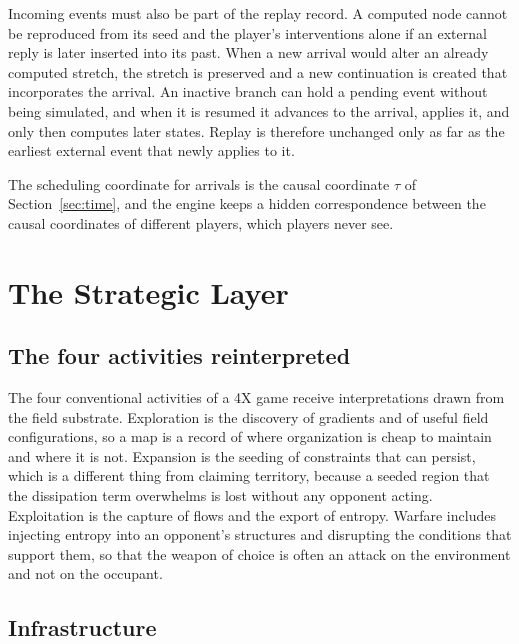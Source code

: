\documentclass[11pt]{article}
\begin{document}
Incoming events must also be part of the replay record. A computed node cannot be reproduced from its seed and the player's interventions alone if an external reply is later inserted into its past. When a new arrival would alter an already computed stretch, the stretch is preserved and a new continuation is created that incorporates the arrival. An inactive branch can hold a pending event without being simulated, and when it is resumed it advances to the arrival, applies it, and only then computes later states. Replay is therefore unchanged only as far as the earliest external event that newly applies to it.

The scheduling coordinate for arrivals is the causal coordinate $\tau$ of Section~\ref{sec:time}, and the engine keeps a hidden correspondence between the causal coordinates of different players, which players never see.

\section{The Strategic Layer}
\label{sec:strategic}

\subsection{The four activities reinterpreted}

The four conventional activities of a 4X game receive interpretations drawn from the field substrate. Exploration is the discovery of gradients and of useful field configurations, so a map is a record of where organization is cheap to maintain and where it is not. Expansion is the seeding of constraints that can persist, which is a different thing from claiming territory, because a seeded region that the dissipation term overwhelms is lost without any opponent acting. Exploitation is the capture of flows and the export of entropy. Warfare includes injecting entropy into an opponent's structures and disrupting the conditions that support them, so that the weapon of choice is often an attack on the environment and not on the occupant.

\subsection{Infrastructure}
\end{document}
